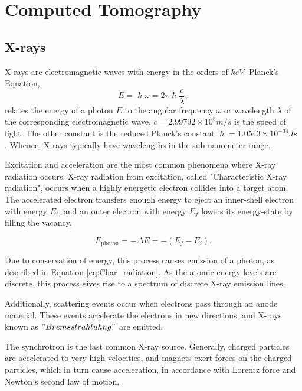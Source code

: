 
\chapter{Computed Tomography}

\section{X-rays}\label{sec:CT_Xrays}

X-rays are electromagnetic waves with energy in the orders of $keV$. Planck's Equation,
\begin{equation}\label{eq:Plancks_eq}
    E = \hslash \omega = 2\pi \hslash \frac{c}{\lambda},
\end{equation}
\noindent
relates the energy of a photon $E$ to the angular frequency $\omega$ or wavelength $\lambda$ of the corresponding electromagnetic wave.
$c = 2.99792 \times 10^8 m/s$ is the speed of light.
The other constant is the reduced Planck's constant $\hslash = 1.0543 \times 10^{-34} Js$  \cite{blokhin1961physics}.
Whence, X-rays typically have wavelengths in the sub-nanometer range.


Excitation and acceleration are the most common phenomena where X-ray radiation occurs.
X-ray radiation from excitation, called "Characteristic X-ray radiation", occurs when a highly energetic electron collides into a target atom.
The accelerated electron transfers enough energy to eject an inner-shell electron with energy $E_i$,
and an outer electron with energy $E_f$ lowers its energy-state by filling the vacancy,

\begin{equation}\label{eq:Char_radiation}
    E_{\mathrm{photon}} = - \Delta E = - (E_f - E_i).
\end{equation}

Due to conservation of energy, this process causes emission of a photon, as described in Equation \eqref{eq:Char_radiation}.
As the atomic energy levels are discrete, this process gives rise to a spectrum of discrete X-ray emission lines.


Additionally, scattering events occur when electrons pass through an anode material.
These events accelerate the electrons in new directions, and X-rays known as $"Bremsstrahluhng"$ are emitted. %

The synchrotron is the last common X-ray source.
Generally, charged particles are accelerated to very high velocities, and magnets exert forces on the charged particles, which in turn cause acceleration, in accordance with
Lorentz force and Newton's second law of motion,

